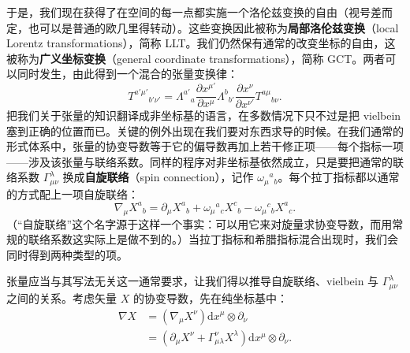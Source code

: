 于是，我们现在获得了在空间的每一点都实施一个洛伦兹变换的自由（视号差而定，也可以是普通的欧几里得转动）。这些变换因此被称为\textbf{局部洛伦兹变换}（local Lorentz transformations），简称 LLT。我们仍然保有通常的改变坐标的自由，这被称为\textbf{广义坐标变换}（general coordinate transformations），简称 GCT。两者可以同时发生，由此得到一个混合的张量变换律：
\begin{equation*}
T^{a'\mu'}{}_{b'\nu'} = \Lambda^{a'}{}_{a}\frac{\partial x^{\mu'}}{\partial x^{\mu}}\Lambda^{b}{}_{b'}\frac{\partial x^{\nu}}{\partial x^{\nu'}}T^{a\mu}{}_{b\nu}.
\tag{J.16}
\end{equation*}
把我们关于张量的知识翻译成非坐标基的语言，在多数情况下只不过是把 vielbein 塞到正确的位置而已。关键的例外出现在我们要对东西求导的时候。在我们通常的形式体系中，张量的协变导数等于它的偏导数再加上若干修正项——每个指标一项——涉及该张量与联络系数。同样的程序对非坐标基依然成立，只是要把通常的联络系数 $\Gamma^{\lambda}_{\mu\nu}$ 换成\textbf{自旋联络}（spin connection），记作 $\omega_{\mu}{}^{a}{}_{b}$。每个拉丁指标都以通常的方式配上一项自旋联络：
\begin{equation*}
\nabla_{\mu}X^{a}{}_{b} = \partial_{\mu}X^{a}{}_{b} + \omega_{\mu}{}^{a}{}_{c}X^{c}{}_{b} - \omega_{\mu}{}^{c}{}_{b}X^{a}{}_{c}.
\tag{J.17}
\end{equation*}
（“自旋联络”这个名字源于这样一个事实：可以用它来对旋量求协变导数，而用常规的联络系数这实际上是做不到的。）当拉丁指标和希腊指标混合出现时，我们会同时得到两种类型的项。

张量应当与其写法无关这一通常要求，让我们得以推导自旋联络、vielbein 与 $\Gamma^{\lambda}_{\mu\nu}$ 之间的关系。考虑矢量 $X$ 的协变导数，先在纯坐标基中：
\begin{align*}
\nabla X &= (\nabla_{\mu}X^{\nu})\mathrm{d}x^{\mu}\otimes\partial_{\nu} \\
&= (\partial_{\mu}X^{\nu} + \Gamma^{\nu}_{\mu\lambda}X^{\lambda})\mathrm{d}x^{\mu}\otimes\partial_{\nu}. \tag{J.18}
\end{align*}

